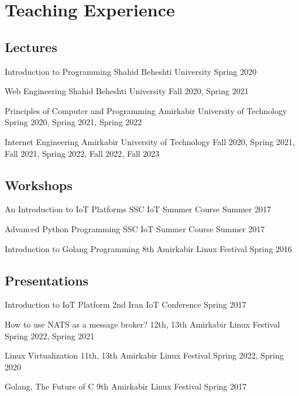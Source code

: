 \section{Teaching Experience}

\subsection{Lectures}
\cventry{}
  {Introduction to Programming}
  {}
  {Shahid Beheshti University}
  {}
  {Spring 2020}

\cventry{}
  {Web Engineering}
  {}
  {Shahid Beheshti University}
  {}
  {Fall 2020, Spring 2021}

\cventry{}
  {Principles of Computer and Programming}
  {}
  {Amirkabir University of Technology}
  {}
  {Spring 2020, Spring 2021, Spring 2022}

\cventry{}
  {Internet Engineering}
  {}
  {Amirkabir University of Technology}
  {}
  {Fall 2020, Spring 2021, Fall 2021, Spring 2022, Fall 2022, Fall 2023}

\subsection{Workshops}

\cventry{}
  {An Introduction to IoT Platforms}
  {}
  {SSC IoT Summer Course}
  {}
  {Summer 2017}

\cventry{}
  {Advanced Python Programming}
  {}
  {SSC IoT Summer Course}
  {}
  {Summer 2017}

\cventry{}
  {Introduction to Golang Programming}
  {}
  {8th Amirkabir Linux Festival}
  {}
  {Spring 2016}

\subsection{Presentations}

\cventry{}
  {Introduction to IoT Platform}
  {}
  {2nd Iran IoT Conference}
  {}
  {Spring 2017}

\cventry{}
  {How to use NATS as a message broker?}
  {}
  {12th, 13th Amirkabir Linux Festival}
  {}
  {Spring 2022, Spring 2021}

\cventry{}
  {Linux Virtualization}
  {}
  {11th, 13th Amirkabir Linux Festival}
  {}
  {Spring 2022, Spring 2020}

\cventry{}
  {Golang, The Future of C}
  {}
  {9th Amirkabir Linux Festival}
  {}
  {Spring 2017}
